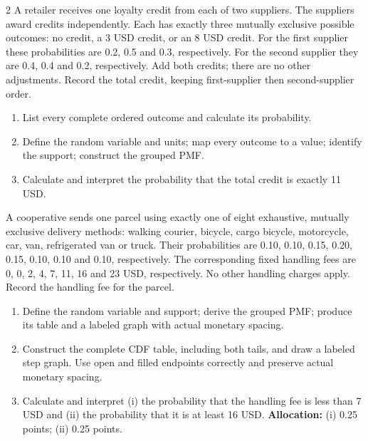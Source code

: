 \begin{multicols*}{2}
\columnbreak
{}
A retailer receives one loyalty credit from each of two suppliers. The suppliers award credits independently. Each has exactly three mutually exclusive possible outcomes: no credit, a 3 USD credit, or an 8 USD credit. For the first supplier these probabilities are 0.2, 0.5 and 0.3, respectively. For the second supplier they are 0.4, 0.4 and 0.2, respectively. Add both credits; there are no other adjustments. Record the total credit, keeping first-supplier then second-supplier order.

\begin{enumerate}[label=(\alph*)]
\item List every complete ordered outcome and calculate its probability. 
\item Define the random variable and units; map every outcome to a value; identify the support; construct the grouped PMF. 
\item Calculate and interpret the probability that the total credit is exactly 11 USD. 
\end{enumerate}

\columnbreak
{}
A cooperative sends one parcel using exactly one of eight exhaustive, mutually exclusive delivery methods: walking courier, bicycle, cargo bicycle, motorcycle, car, van, refrigerated van or truck. Their probabilities are 0.10, 0.10, 0.15, 0.20, 0.15, 0.10, 0.10 and 0.10, respectively. The corresponding fixed handling fees are 0, 0, 2, 4, 7, 11, 16 and 23 USD, respectively. No other handling charges apply. Record the handling fee for the parcel.

\begin{enumerate}[label=(\alph*)]
\item Define the random variable and support; derive the grouped PMF; produce its table and a labeled graph with actual monetary spacing. 
\item Construct the complete CDF table, including both tails, and draw a labeled step graph. Use open and filled endpoints correctly and preserve actual monetary spacing. 
\item Calculate and interpret (i) the probability that the handling fee is less than 7 USD and (ii) the probability that it is at least 16 USD. 
\textbf{Allocation:} (i) 0.25 points; (ii) 0.25 points.
\end{enumerate}


\end{multicols*}
